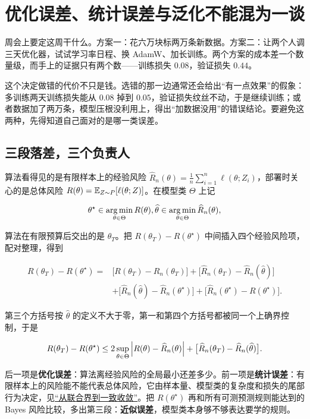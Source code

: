 \section{优化误差、统计误差与泛化不能混为一谈}
\label{sec:09-Convex-Optimization/08-Nonconvex-and-Stochastic-Optimization/06}

周会上要定这周干什么。方案一：花六万块标两万条新数据。方案二：让两个人调三天优化器，试试学习率日程、换 AdamW、加长训练。两个方案的成本差一个数量级，而手上的证据只有两个数——训练损失 \(0.08\)，验证损失 \(0.44\)。

这个决定做错的代价不只是钱。选错的那一边通常还会给出``有一点效果''的假象：多训练两天训练损失能从 \(0.08\) 掉到 \(0.05\)，验证损失纹丝不动，于是继续训练；或者数据加了两万条，模型压根没利用上，得出``加数据没用''的错误结论。要避免这两种，先得知道自己面对的是哪一类误差。

\subsection{三段落差，三个负责人}

算法看得见的是有限样本上的经验风险 \(\widehat R_n(\theta)=\frac1n\sum_{i=1}^n\ell(\theta;Z_i)\)，部署时关心的是总体风险 \(R(\theta)=\mathbb{E}_{Z\sim P}[\ell(\theta;Z)]\)。在模型类 \(\Theta\) 上记

\[
\theta^\star\in\operatorname*{arg\,min}_{\theta\in\Theta}R(\theta),\space
\widehat\theta\in\operatorname*{arg\,min}_{\theta\in\Theta}\widehat R_n(\theta),
\]

算法在有限预算后交出的是 \(\theta_T\)。把 \(R(\theta_T)-R(\theta^\star)\) 中间插入四个经验风险项，配对整理，得到

\[
\begin{aligned}
R(\theta_T)-R(\theta^\star)
={}&\bigl[R(\theta_T)-\widehat R_n(\theta_T)\bigr]
+\bigl[\widehat R_n(\theta_T)-\widehat R_n(\widehat\theta)\bigr]\\
&+\bigl[\widehat R_n(\widehat\theta)-\widehat R_n(\theta^\star)\bigr]
+\bigl[\widehat R_n(\theta^\star)-R(\theta^\star)\bigr].
\end{aligned}
\]

第三个方括号按 \(\widehat\theta\) 的定义不大于零，第一和第四个方括号都被同一个上确界控制，于是

\[
R(\theta_T)-R(\theta^\star)\le
2\sup_{\theta\in\Theta}\left|R(\theta)-\widehat R_n(\theta)\right|
+\bigl[\widehat R_n(\theta_T)-\widehat R_n(\widehat\theta)\bigr].
\]

后一项是\textbf{优化误差}：算法离经验风险的全局最小还差多少。前一项是\textbf{统计误差}：有限样本上的风险能不能代表总体风险，它由样本量、模型类的复杂度和损失的尾部行为决定，见\hyperref[sec:13-Machine-Learning/10-Learning-Theory/02]{``从联合界到一致收敛''}。把 \(R(\theta^\star)\) 再和所有可测预测规则能达到的 Bayes 风险比较，多出第三段：\textbf{近似误差}，模型类本身够不够表达要学的规则。

